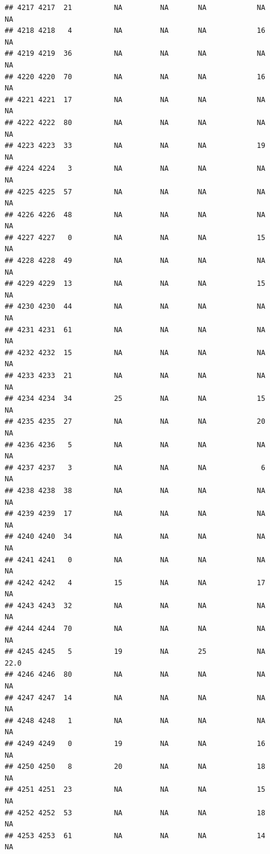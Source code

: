 \documentclass[man]{apa6}
\begin{document}
\begin{verbatim}
## 4217 4217  21          NA         NA       NA            NA       NA
## 4218 4218   4          NA         NA       NA            16       NA
## 4219 4219  36          NA         NA       NA            NA       NA
## 4220 4220  70          NA         NA       NA            16       NA
## 4221 4221  17          NA         NA       NA            NA       NA
## 4222 4222  80          NA         NA       NA            NA       NA
## 4223 4223  33          NA         NA       NA            19       NA
## 4224 4224   3          NA         NA       NA            NA       NA
## 4225 4225  57          NA         NA       NA            NA       NA
## 4226 4226  48          NA         NA       NA            NA       NA
## 4227 4227   0          NA         NA       NA            15       NA
## 4228 4228  49          NA         NA       NA            NA       NA
## 4229 4229  13          NA         NA       NA            15       NA
## 4230 4230  44          NA         NA       NA            NA       NA
## 4231 4231  61          NA         NA       NA            NA       NA
## 4232 4232  15          NA         NA       NA            NA       NA
## 4233 4233  21          NA         NA       NA            NA       NA
## 4234 4234  34          25         NA       NA            15       NA
## 4235 4235  27          NA         NA       NA            20       NA
## 4236 4236   5          NA         NA       NA            NA       NA
## 4237 4237   3          NA         NA       NA             6       NA
## 4238 4238  38          NA         NA       NA            NA       NA
## 4239 4239  17          NA         NA       NA            NA       NA
## 4240 4240  34          NA         NA       NA            NA       NA
## 4241 4241   0          NA         NA       NA            NA       NA
## 4242 4242   4          15         NA       NA            17       NA
## 4243 4243  32          NA         NA       NA            NA       NA
## 4244 4244  70          NA         NA       NA            NA       NA
## 4245 4245   5          19         NA       25            NA     22.0
## 4246 4246  80          NA         NA       NA            NA       NA
## 4247 4247  14          NA         NA       NA            NA       NA
## 4248 4248   1          NA         NA       NA            NA       NA
## 4249 4249   0          19         NA       NA            16       NA
## 4250 4250   8          20         NA       NA            18       NA
## 4251 4251  23          NA         NA       NA            15       NA
## 4252 4252  53          NA         NA       NA            18       NA
## 4253 4253  61          NA         NA       NA            14       NA

\end{verbatim}
\end{document}
